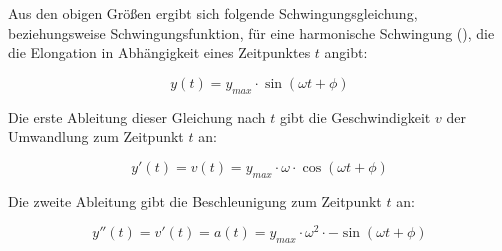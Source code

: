 Aus den obigen Größen ergibt sich folgende Schwingungsgleichung, beziehungsweise Schwingungsfunktion, für eine harmonische Schwingung (), die die Elongation in Abhängigkeit eines Zeitpunktes $t$ angibt:

\begin{equation} \label{eq:schwingungsgleichung_y}
	y(t)=y_{max} \cdot \sin{(\omega t + \phi)}
\end{equation}

\noindent Die erste Ableitung dieser Gleichung nach $t$ gibt die Geschwindigkeit $v$ der Umwandlung zum Zeitpunkt $t$ an:

\begin{equation} \label{eq:schwingungsgleichung_v}
	y'(t)=v(t)=y_{max} \cdot \omega \cdot \cos{(\omega t + \phi)}
\end{equation}

\noindent Die zweite Ableitung gibt die Beschleunigung zum Zeitpunkt $t$ an:

\begin{equation} \label{eq:schwingungsgleichung_a}
	y''(t)=v'(t)=a(t)=y_{max} \cdot \omega^{2} \cdot -\sin{(\omega t + \phi)}
\end{equation}